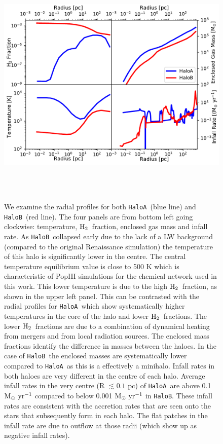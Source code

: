 \documentclass[graphics, twocolumn, usenatbib]{mn2e}
\newcommand{\msolaryr} {$\rm{M_{\odot}~yr^{-1}}~$}
\newcommand{\molH} {$\rm{H_2}$~}
\newcommand{\ha} {\texttt{HaloA~}}
\newcommand{\hb} {\texttt{HaloB~}}
\newcommand{\hbc} {\texttt{HaloB}}
\begin{document}
\begin{figure}
\centering
\begin{minipage}{175mm}      \begin{center}
\centerline{
    \includegraphics[width=18.0cm, height=12cm]{FIGURES/MultiPlot.pdf}}
\caption{We examine the radial profiles for both \ha (blue line) and \hb (red line). The four panels
  are from bottom left going clockwise: temperature, \molH fraction, enclosed gas mass and infall rate.
  As \hb collapsed early due to the lack of a LW background (compared to the original Renaissance simulation)
  the temperature of this halo is significantly lower in the centre. The central temperature equilibrium
  value is close to 500 K which is characteristic of PopIII simulations for the chemical network used in this work.
  This lower temperature is due to the high \molH fraction, as shown in the upper left panel. This can
  be contrasted with the radial profiles for \ha which show systematically higher temperatures in the core of the
  halo and lower \molH fractions. The lower \molH fractions are due to a combination of dynamical heating from
  mergers and from local radiation sources. The enclosed mass fractions identify the difference
  in masses between the haloes. In the case of \hb the enclosed masses are systematically lower compared
  to \ha as this is a effectively a minihalo. Infall rates in both haloes are very different in the
  centre of each halo. Average infall rates in the very centre (R $\lesssim 0.1$ pc) of \ha are
  above 0.1 \msolaryr compared to below 0.001 \msolaryr in \hbc. These infall rates are consistent
  with the accretion rates that are seen onto the stars that subsequently form in each halo. The flat
  patches in the infall rate are due to outflow at those radii
  (which show up as negative infall rates). }
\label{Fig:RadialProfiles}
\end{center} \end{minipage}
\end{figure}
\end{document}
